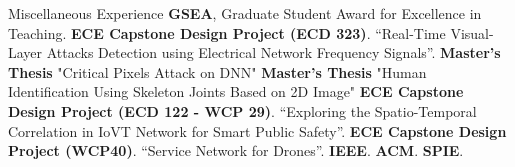 \begin{rubric}{Miscellaneous Experience}
\entry*[2020] \textbf{GSEA}, Graduate Student Award for Excellence in Teaching.
%
\entry*[2022-2023] \textbf{ECE Capstone Design Project (ECD 323)}. “Real-Time Visual-Layer Attacks
Detection using Electrical Network Frequency Signals”.
\entry*[2019-2020] \textbf{Master's Thesis} "Critical Pixels Attack on DNN"
\entry*[2019-2020] \textbf{Master's Thesis} "Human Identification Using Skeleton Joints Based on 2D Image"
\entry*[2019-2021] \textbf{ECE Capstone Design Project (ECD 122 - WCP 29)}. “Exploring the Spatio-Temporal Correlation in IoVT Network for Smart Public Safety”.
\entry*[2018-2019] \textbf{ECE Capstone Design Project (WCP40)}. “Service Network for Drones”.
%
\entry*[] \textbf{IEEE}.
\entry*[] \textbf{ACM}.
\entry*[] \textbf{SPIE}.
%
\end{rubric}